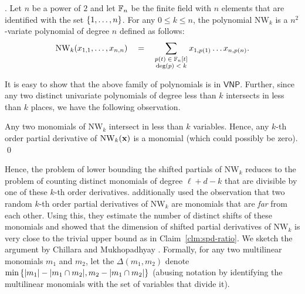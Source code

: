 \begin{definition}. 
Let $n$ be a power of $2$ and let $\mathbb{F}_n$ be the finite field with $n$ elements that are identified with the set $\left\{1,\dots, n\right\}$. For any $0\leq k \leq n$, the polynomial $\mathrm{NW}_k$ is a $n^2$-variate polynomial of degree $n$ defined as follows:
$$
\mathrm{NW}_k(x_{1,1},\dots, x_{n,n}) \quad = \quad \sum_{\substack{p(t) \;\in\; \mathbb{F}_n[t]\\\deg(p) \;<\; k}} x_{1,p(1)}\dots x_{n,p(n)}.
$$
\end{definition}

It is easy to show that the above family of polynomials is in $\mathsf{VNP}$. Further, since any two distinct univariate polynomials of degree less than $k$ intersects in less than $k$ places, we have the following observation. 

\begin{observation}
Any two monomials of $\mathrm{NW}_k$ intersect in less than $k$ variables. Hence, any $k$-th order partial derivative of $\mathrm{NW}_k(\mathbf{x})$ is a monomial (which could possibly be zero). \qed
\end{observation}

Hence, the problem of lower bounding the shifted partials of $\mathrm{NW}_k$ reduces to the problem of counting distinct monomials of degree $\ell + d-k$ that are divisible by one of these $k$-th order derivatives. \cite{KSS13} additionally used the observation that two random $k$-th order partial derivatives of $\mathrm{NW}_k$ are monomials that are \emph{far} from each other. Using this, they estimate the number of distinct shifts of these monomials and showed that the dimension of shifted partial derivatives of $\mathrm{NW}_k$ is very close to the trivial upper bound as in Claim~\ref{clm:spd-ratio}. We sketch the argument by Chillara and Mukhopadhyay \cite{cm14}. Formally, for any two multilinear monomials $m_1$ and $m_2$, let the $\Delta(m_1,m_2)$ denote $\min\left\{|m_1| - |m_1\cap m_2|, m_2 - |m_1 \cap m_2|\right\}$ (abusing notation by identifying the multilinear monomials with the set of variables that divide it). 

